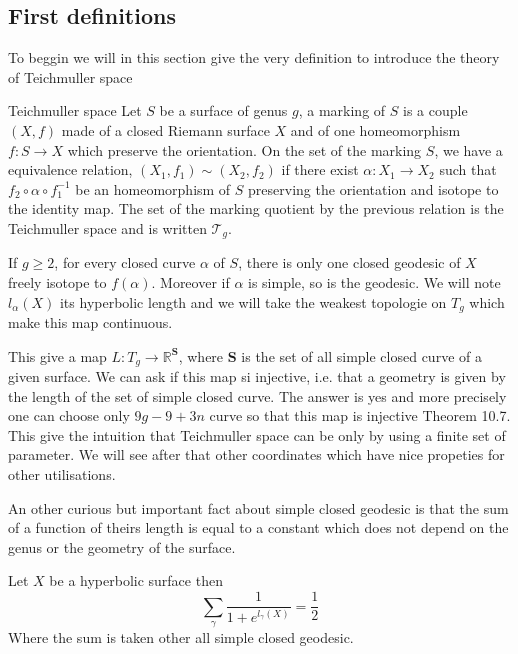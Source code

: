 \subsection{First definitions}

To beggin we will in this section give the very definition to introduce the theory of Teichmuller space

\begin{dfnt}{Teichmuller space}
Let $S$ be a surface of genus $g$, a marking of $S$ is a couple $(X,f)$ made of a closed Riemann surface $X$ and of one homeomorphism $f:S \to X$ which preserve the orientation.
On the set of the marking $S$, we have a equivalence relation,  $(X_1,f_1) \sim (X_2,f_2)$ if there exist $\alpha : X_1 \to X_2 $ such that $f_2 \circ \alpha \circ f_1^{-1}$ be an homeomorphism of $S$ preserving the orientation and isotope to the identity map.
The set of the marking quotient by the previous relation is the Teichmuller space and is written $\mathcal{T}_g$.
\end{dfnt}

\begin{rmq}
If $g \geq 2$, for every closed curve $\alpha$ of $S$, there is only one closed geodesic of $X$ freely isotope to $f(\alpha)$. Moreover if $\alpha$ is simple, so is the geodesic. We will note $l_{\alpha}(X)$ its hyperbolic length and we will take the weakest topologie on $T_g$ which make this map continuous.
\end{rmq}

This give a map $L: T_g \to \mathbb{R}^{\mathbf{S}}$, where $\mathbf{S}$ is the set of all simple closed curve of a given surface. We can ask if this map si injective, i.e. that a geometry is given by the length of the set of simple closed curve. The answer is yes and more precisely one can choose only $9g-9+3n$ curve so that this map is injective \cite{farb2011primer} Theorem 10.7.  This give the intuition that Teichmuller space can be only by using a finite set of parameter. We will see after that other coordinates which have nice propeties for other utilisations.


An other curious but important fact about simple closed geodesic is that the sum of a function of theirs length is equal to a constant which does not depend on the genus or the geometry of the surface.

\begin{thm}
Let $X$ be a hyperbolic surface then \[
\sum_{\gamma} \frac{1}{1+e^{l_{\gamma}(X)}}=\frac{1}{2}
\]
Where the sum is taken other all simple closed geodesic.
\end{thm}

